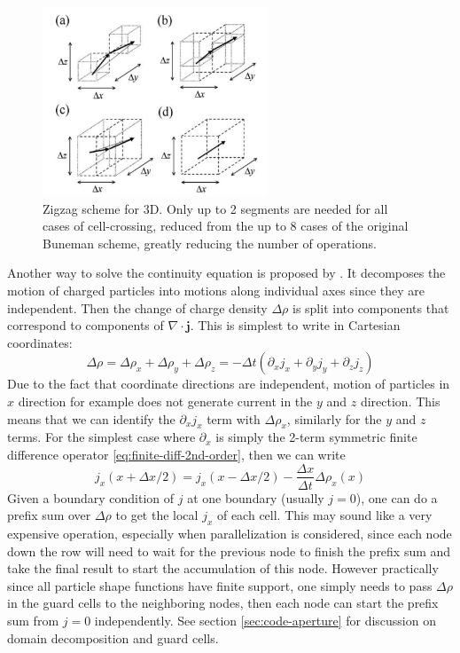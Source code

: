 \begin{figure}[h]
  \centering
  \includegraphics[width=0.6\textwidth]{pics/chap1/umeda-3d.png}
  \caption[Zigzag scheme in 3D.]{Zigzag scheme for 3D. Only up to 2 segments are
    needed for all cases of cell-crossing, reduced from the up to 8 cases of the
    original Buneman scheme, greatly reducing the number of operations. \cite{umeda_new_2003}}
  \label{fig:zigzag-3d}
\end{figure}

Another way to solve the continuity equation is proposed by
\citet{esirkepov_exact_2001}. It decomposes the motion of charged particles into
motions along individual axes since they are independent. Then the change of
charge density $\Delta\rho$ is split into components that correspond to
components of $\nabla\cdot \mathbf{j}$. This is simplest to write in
Cartesian coordinates:
\begin{equation}
  \label{eq:esirkepov-split}
  \Delta \rho = \Delta\rho_{x} + \Delta\rho_{y} + \Delta\rho_{z} = -\Delta t(\partial_{x}j_{x} + \partial_{y}j_{y} + \partial_{z}j_{z})
\end{equation}
Due to the fact that coordinate directions are independent, motion of particles
in $x$ direction for example does not generate current in the $y$ and $z$
direction. This means that we can identify the $\partial_{x}j_{x}$ term with
$\Delta \rho_{x}$, similarly for the $y$ and $z$ terms. For the simplest case
where $\partial_{x}$ is simply the 2-term symmetric finite difference operator
\ref{eq:finite-diff-2nd-order}, then we can write
\begin{equation}
  \label{eq:esirkepov-x-dir}
  j_{x}(x + \Delta x/2) = j_{x}(x - \Delta x/2) - \frac{\Delta x}{\Delta t}\Delta\rho_{x}(x)
\end{equation}
Given a boundary condition of $j$ at one boundary (usually $j = 0$), one can do
a prefix sum over $\Delta\rho$ to get the local $j_{x}$ of each cell. This may
sound like a very expensive operation, especially when parallelization is
considered, since each node down the row will need to wait for the previous node
to finish the prefix sum and take the final result to start the accumulation of
this node. However practically since all particle shape functions have finite
support, one simply needs to pass $\Delta\rho$ in the guard cells to the
neighboring nodes, then each node can start the prefix sum from $j = 0$
independently. See section \ref{sec:code-aperture} for discussion on domain
decomposition and guard cells.

